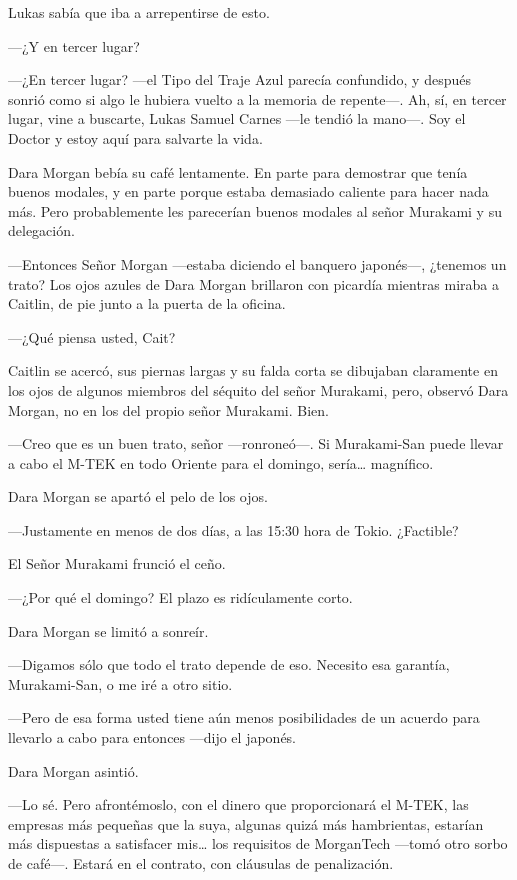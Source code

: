 Lukas sabía que iba a arrepentirse de esto.

---¿Y en tercer lugar?

---¿En tercer lugar? ---el Tipo del Traje Azul parecía confundido, y
después sonrió como si algo le hubiera vuelto a la memoria de
repente---. Ah, sí, en tercer lugar, vine a buscarte, Lukas Samuel
Carnes ---le tendió la mano---. Soy el Doctor y estoy aquí para salvarte
la vida.

Dara Morgan bebía su café lentamente. En parte para demostrar que tenía
buenos modales, y en parte porque estaba demasiado caliente para hacer
nada más. Pero probablemente les parecerían buenos modales al señor
Murakami y su delegación.

---Entonces Señor Morgan ---estaba diciendo el banquero japonés---,
¿tenemos un trato? Los ojos azules de Dara Morgan brillaron con
picardía mientras miraba a Caitlin, de pie junto a la puerta de la
oficina.

---¿Qué piensa usted, Cait?

Caitlin se acercó, sus piernas largas y su falda corta se dibujaban
claramente en los ojos de algunos miembros del séquito del señor
Murakami, pero, observó Dara Morgan, no en los del propio señor
Murakami. Bien.

---Creo que es un buen trato, señor ---ronroneó---. Si Murakami-San
puede llevar a cabo el M-TEK en todo Oriente para el domingo,
sería\ldots{} magnífico.

Dara Morgan se apartó el pelo de los ojos.

---Justamente en menos de dos días, a las 15:30 hora de Tokio.
¿Factible?

El Señor Murakami frunció el ceño.

---¿Por qué el domingo? El plazo es ridículamente corto.

Dara Morgan se limitó a sonreír.

---Digamos sólo que todo el trato depende de eso. Necesito esa garantía,
Murakami-San, o me iré a otro sitio.

---Pero de esa forma usted tiene aún menos posibilidades de un acuerdo
para llevarlo a cabo para entonces ---dijo el japonés.

Dara Morgan asintió.

---Lo sé. Pero afrontémoslo, con el dinero que proporcionará el M-TEK,
las empresas más pequeñas que la suya, algunas quizá más hambrientas,
estarían más dispuestas a satisfacer mis\ldots{} los requisitos de
MorganTech ---tomó otro sorbo de café---. Estará en el contrato, con
cláusulas de penalización.

